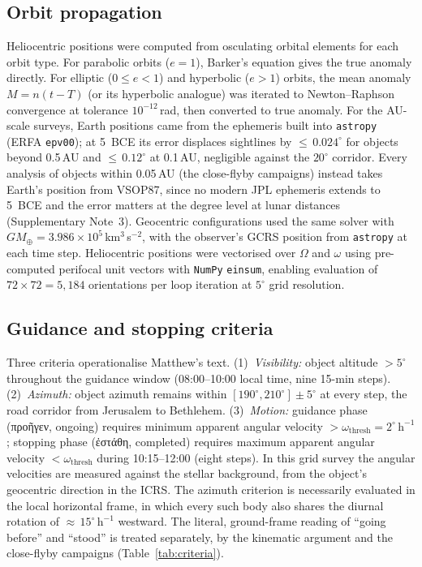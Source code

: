 \documentclass[sn-nature]{sn-jnl}
\newcommand{\grk}[1]{{\fontencoding{LGR}\selectfont #1}}
\newcommand{\grk}[1]{{\greekfont #1}}
\begin{document}
\subsection{Orbit propagation}

Heliocentric positions were computed from osculating orbital elements for
each orbit type. For parabolic orbits ($e=1$), Barker's equation gives the
true anomaly directly. For elliptic ($0\le e<1$) and hyperbolic ($e>1$)
orbits, the mean anomaly $M = n(t-T)$ (or its hyperbolic analogue) was
iterated to Newton--Raphson convergence at tolerance $10^{-12}$\,rad, then
converted to true anomaly. For the AU-scale surveys, Earth positions came
from the ephemeris built into \texttt{astropy} (ERFA \texttt{epv00}); at 5~BCE
its error displaces sightlines by ${\leq}\,0.024^\circ$ for objects beyond
0.5\,AU and ${\leq}\,0.12^\circ$ at 0.1\,AU, negligible against the
$20^\circ$ corridor. Every analysis of objects within 0.05\,AU (the
close-flyby campaigns) instead takes Earth's position from VSOP87, since no
modern JPL ephemeris extends to 5~BCE and the error matters at the degree
level at lunar distances (Supplementary Note~3). Geocentric configurations used the same solver
with $GM_\oplus = 3.986\times10^5$\,km$^3$\,s$^{-2}$, with the observer's
GCRS position from \texttt{astropy} at each time step. Heliocentric
positions were vectorised over $\Omega$ and $\omega$ using pre-computed
perifocal unit vectors with \texttt{NumPy}\cite{harris2020}
\texttt{einsum}, enabling evaluation of $72\times72=5{,}184$ orientations
per loop iteration at $5^\circ$ grid resolution.

\subsection{Guidance and stopping criteria}

Three criteria operationalise Matthew's text. (1)~\textit{Visibility:}
object altitude $>5^\circ$ throughout the guidance window
(08:00--10:00 local time, nine 15-min steps). (2)~\textit{Azimuth:}
object azimuth remains within $[190^\circ, 210^\circ]\pm5^\circ$ at every
step, the road corridor from Jerusalem to Bethlehem. (3)~\textit{Motion:}
guidance phase (\grk{προῆγεν}, ongoing) requires minimum apparent angular
velocity $>\omega_\text{thresh}=2^\circ\,\mathrm{h}^{-1}$; stopping phase
(\grk{ἐστάθη}, completed) requires maximum apparent angular velocity
$<\omega_\text{thresh}$ during 10:15--12:00 (eight steps).
In this grid survey the angular velocities are measured against the stellar
background, from the object's geocentric direction in the ICRS. The azimuth
criterion is necessarily evaluated in the local horizontal frame, in which
every such body also shares the diurnal rotation of ${\approx}\,15^\circ\,\mathrm{h}^{-1}$
westward. The literal, ground-frame reading of ``going before'' and
``stood'' is treated separately, by the kinematic argument and the
close-flyby campaigns (Table~\ref{tab:criteria}).
\end{document}

